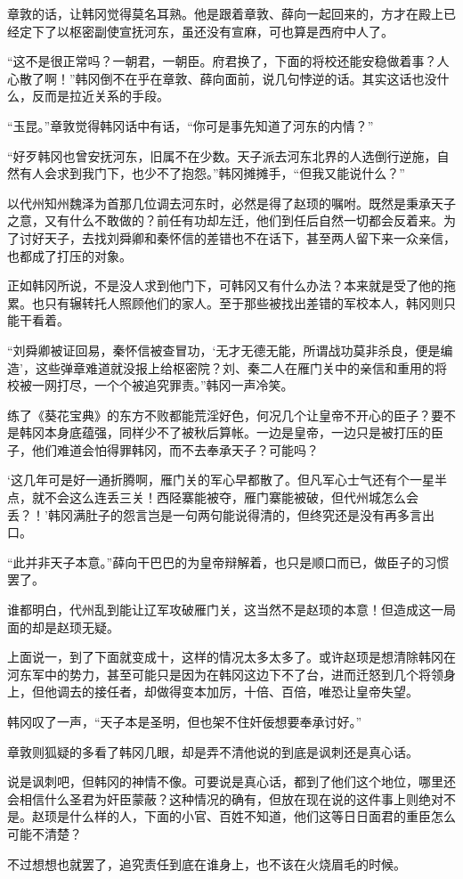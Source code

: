 章敦的话，让韩冈觉得莫名耳熟。他是跟着章敦、薛向一起回来的，方才在殿上已经定下了以枢密副使宣抚河东，虽还没有宣麻，可也算是西府中人了。

“这不是很正常吗？一朝君，一朝臣。府君换了，下面的将校还能安稳做着事？人心散了啊！”韩冈倒不在乎在章敦、薛向面前，说几句悖逆的话。其实这话也没什么，反而是拉近关系的手段。

“玉昆。”章敦觉得韩冈话中有话，“你可是事先知道了河东的内情？”

“好歹韩冈也曾安抚河东，旧属不在少数。天子派去河东北界的人选倒行逆施，自然有人会求到我门下，也少不了抱怨。”韩冈摊摊手，“但我又能说什么？”

以代州知州魏泽为首那几位调去河东时，必然是得了赵顼的嘱咐。既然是秉承天子之意，又有什么不敢做的？前任有功却左迁，他们到任后自然一切都会反着来。为了讨好天子，去找刘舜卿和秦怀信的差错也不在话下，甚至两人留下来一众亲信，也都成了打压的对象。

正如韩冈所说，不是没人求到他门下，可韩冈又有什么办法？本来就是受了他的拖累。也只有辗转托人照顾他们的家人。至于那些被找出差错的军校本人，韩冈则只能干看着。

“刘舜卿被证回易，秦怀信被查冒功，‘无才无德无能，所谓战功莫非杀良，便是编造’，这些弹章难道就没报上给枢密院？刘、秦二人在雁门关中的亲信和重用的将校被一网打尽，一个个被追究罪责。”韩冈一声冷笑。

练了《葵花宝典》的东方不败都能荒淫好色，何况几个让皇帝不开心的臣子？要不是韩冈本身底蕴强，同样少不了被秋后算帐。一边是皇帝，一边只是被打压的臣子，他们难道会怕得罪韩冈，而不去奉承天子？可能吗？

‘这几年可是好一通折腾啊，雁门关的军心早都散了。但凡军心士气还有个一星半点，就不会这么连丢三关！西陉寨能被夺，雁门寨能被破，但代州城怎么会丢？！’韩冈满肚子的怨言岂是一句两句能说得清的，但终究还是没有再多言出口。

“此并非天子本意。”薛向干巴巴的为皇帝辩解着，也只是顺口而已，做臣子的习惯罢了。

谁都明白，代州乱到能让辽军攻破雁门关，这当然不是赵顼的本意！但造成这一局面的却是赵顼无疑。

上面说一，到了下面就变成十，这样的情况太多太多了。或许赵顼是想清除韩冈在河东军中的势力，甚至可能只是因为在韩冈这边下不了台，进而迁怒到几个将领身上，但他调去的接任者，却做得变本加厉，十倍、百倍，唯恐让皇帝失望。

韩冈叹了一声，“天子本是圣明，但也架不住奸佞想要奉承讨好。”

章敦则狐疑的多看了韩冈几眼，却是弄不清他说的到底是讽刺还是真心话。

说是讽刺吧，但韩冈的神情不像。可要说是真心话，都到了他们这个地位，哪里还会相信什么圣君为奸臣蒙蔽？这种情况的确有，但放在现在说的这件事上则绝对不是。赵顼是什么样的人，下面的小官、百姓不知道，他们这等日日面君的重臣怎么可能不清楚？

不过想想也就罢了，追究责任到底在谁身上，也不该在火烧眉毛的时候。
